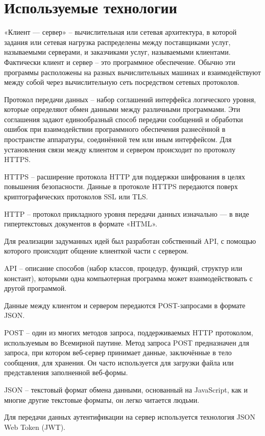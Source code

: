 \documentclass[14pt, a4paper]{extarticle}
\begin{document}
    \newpage
    \section{Используемые технологии}
    «Клиент — сервер» – вычислительная или сетевая архитектура, в которой задания или сетевая нагрузка распределены между поставщиками услуг, называемыми серверами, и заказчиками услуг, называемыми клиентами. Фактически клиент и сервер – это программное обеспечение. Обычно эти программы расположены на разных вычислительных машинах и взаимодействуют между собой через вычислительную сеть посредством сетевых протоколов.

    Протокол передачи данных – набор соглашений интерфейса логического уровня, которые определяют обмен данными между различными программами. Эти соглашения задают единообразный способ передачи сообщений и обработки ошибок при взаимодействии программного обеспечения разнесённой в пространстве аппаратуры, соединённой тем или иным интерфейсом. Для установления связи между клиентом и сервером происходит по протоколу HTTPS.

    HTTPS – расширение протокола HTTP для поддержки шифрования в целях повышения безопасности. Данные в протоколе HTTPS передаются поверх криптографических протоколов SSL или TLS.

    HTTP – протокол прикладного уровня передачи данных изначально — в виде гипертекстовых документов в формате «HTML».

    Для реализации задуманных идей был разработан собственный API, с помощью которого происходит общение клиенткой части с сервером.

    API – описание способов (набор классов, процедур, функций, структур или констант), которыми одна компьютерная программа может взаимодействовать с другой программой.

    Данные между клиентом и сервером передаются POST-запросами в формате JSON.

    POST – один из многих методов запроса, поддерживаемых HTTP протоколом, используемым во Всемирной паутине. Метод запроса POST предназначен для запроса, при котором веб-сервер принимает данные, заключённые в тело сообщения, для хранения. Он часто используется для загрузки файла или представления заполненной веб-формы.

    JSON – текстовый формат обмена данными, основанный на JavaScript, как и многие другие текстовые форматы, он легко читается людьми.

    Для передачи данных аутентификации на сервер используется технология JSON Web Token (JWT).
\end{document}
